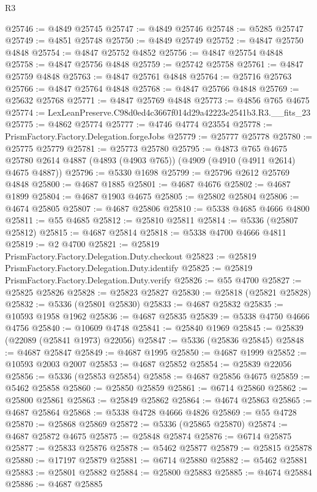 \begin{lexlean}{R3}
\begin{coremodule}
@25746 := @4849 @25745
@25747 := @4849 @25746
@25748 := @5285 @25747
@25749 := @4851 @25748
@25750 := @4849 @25749
@25752 := @4847 @25750 @4848
@25754 := @4847 @25752 @4852
@25756 := @4847 @25754 @4848
@25758 := @4847 @25756 @4848
@25759 := @25742 @25758
@25761 := @4847 @25759 @4848
@25763 := @4847 @25761 @4848
@25764 := @25716 @25763
@25766 := @4847 @25764 @4848
@25768 := @4847 @25766 @4848
@25769 := @25632 @25768
@25771 := @4847 @25769 @4848
@25773 := @4856 @765 @4675
@25774 := LexLeanPreserve.C98d0ed4c3667f014d29a42223e2541b3.R3.__fits_23
@25775 := @4862 @25774
@25777 := @4746 @4774 @23554
@25778 := PrismFactory.Factory.Delegation.forgeJobs
@25779 := @25777 @25778
@25780 := @25775 @25779
@25781 := @25773 @25780
@25795 := @4873
    @765
    @4675
    @25780
    @2614
    @4887
    (@4893 (@4903 @765))
    (@4909 (@4910 (@4911 @2614) @4675 @4887))
@25796 := @5330 @1698
@25799 := @25796 @2612 @25769 @4848
@25800 := @4687 @1885
@25801 := @4687 @4676
@25802 := @4687 @1899
@25804 := @4687 @1903 @4675
@25805 := @25802 @25804
@25806 := @4674 @25805
@25807 := @4687 @25806
@25810 := @5338 @4685 @4666 @4800
@25811 := @55 @4685
@25812 := @25810 @25811
@25814 := @5336 (@25807 @25812)
@25815 := @4687 @25814
@25818 := @5338 @4700 @4666 @4811
@25819 := @2 @4700
@25821 := @25819 PrismFactory.Factory.Delegation.Duty.checkout
@25823 := @25819 PrismFactory.Factory.Delegation.Duty.identify
@25825 := @25819 PrismFactory.Factory.Delegation.Duty.verify
@25826 := @55 @4700
@25827 := @25825 @25826
@25828 := @25823 @25827
@25830 := @25818 (@25821 @25828)
@25832 := @5336 (@25801 @25830)
@25833 := @4687 @25832
@25835 := @10593 @1958 @1962
@25836 := @4687 @25835
@25839 := @5338 @4750 @4666 @4756
@25840 := @10609 @4748
@25841 := @25840 @1969
@25845 := @25839 (@22089 (@25841 @1973) @22056)
@25847 := @5336 (@25836 @25845)
@25848 := @4687 @25847
@25849 := @4687 @1995
@25850 := @4687 @1999
@25852 := @10593 @2003 @2007
@25853 := @4687 @25852
@25854 := @25839 @22056
@25856 := @5336 (@25853 @25854)
@25858 := @4687 @25856 @4675
@25859 := @5462 @25858
@25860 := @25850 @25859
@25861 := @6714 @25860
@25862 := @25800 @25861
@25863 := @25849 @25862
@25864 := @4674 @25863
@25865 := @4687 @25864
@25868 := @5338 @4728 @4666 @4826
@25869 := @55 @4728
@25870 := @25868 @25869
@25872 := @5336 (@25865 @25870)
@25874 := @4687 @25872 @4675
@25875 := @25848 @25874
@25876 := @6714 @25875
@25877 := @25833 @25876
@25878 := @5462 @25877
@25879 := @25815 @25878
@25880 := @17197 @25879
@25881 := @6714 @25880
@25882 := @5462 @25881
@25883 := @25801 @25882
@25884 := @25800 @25883
@25885 := @4674 @25884
@25886 := @4687 @25885

\end{coremodule}
\end{lexlean}
